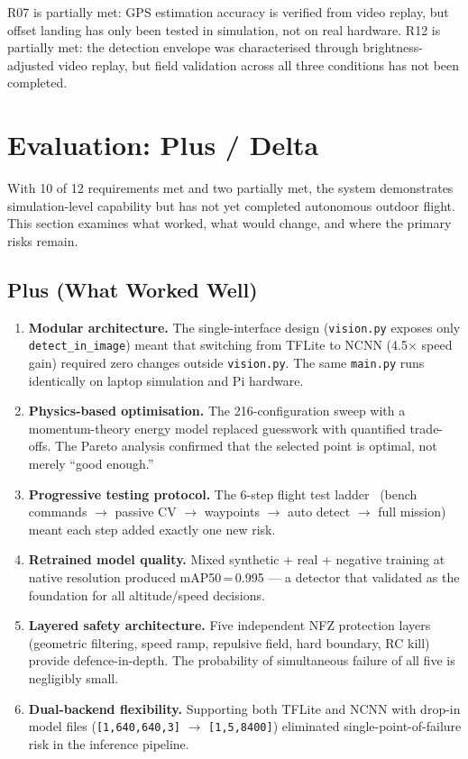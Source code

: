 \documentclass[10pt,a4paper]{article}
\begin{document}
R07 is partially met: GPS estimation accuracy is verified from video replay, but offset landing has only been tested in simulation, not on real hardware. R12 is partially met: the detection envelope was characterised through brightness-adjusted video replay, but field validation across all three conditions has not been completed.


\section{Evaluation: Plus / Delta}\label{sec:plusdelta}

With 10 of 12 requirements met and two partially met, the system demonstrates simulation-level capability but has not yet completed autonomous outdoor flight. This section examines what worked, what would change, and where the primary risks remain.

\subsection{Plus (What Worked Well)}

\begin{enumerate}[nosep]
  \item \textbf{Modular architecture.} The single-interface design (\texttt{vision.py} exposes only \texttt{detect\_in\_image}) meant that switching from TFLite to NCNN (4.5$\times$ speed gain) required zero changes outside \texttt{vision.py}. The same \texttt{main.py} runs identically on laptop simulation and Pi hardware.
  \item \textbf{Physics-based optimisation.} The 216-configuration sweep with a momentum-theory energy model replaced guesswork with quantified trade-offs. The Pareto analysis confirmed that the selected point is optimal, not merely ``good enough.''
  \item \textbf{Progressive testing protocol.} The 6-step flight test ladder~\citep{nasa2015vv,koopman2016challenges} (bench commands $\to$ passive CV $\to$ waypoints $\to$ auto detect $\to$ full mission) meant each step added exactly one new risk.
  \item \textbf{Retrained model quality.} Mixed synthetic + real + negative training at native resolution produced mAP50\,=\,0.995 --- a detector that validated as the foundation for all altitude/speed decisions.
  \item \textbf{Layered safety architecture.} Five independent NFZ protection layers (geometric filtering, speed ramp, repulsive field, hard boundary, RC kill) provide defence-in-depth. The probability of simultaneous failure of all five is negligibly small.
  \item \textbf{Dual-backend flexibility.} Supporting both TFLite and NCNN with drop-in model files (\texttt{[1,640,640,3]} $\to$ \texttt{[1,5,8400]}) eliminated single-point-of-failure risk in the inference pipeline.
\end{enumerate}
\end{document}
